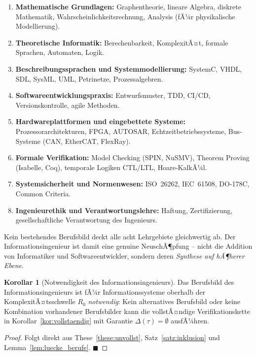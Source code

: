 ﻿\documentclass[a4paper,12pt]{report}
\theoremstyle{definition}
\newtheorem{korollar}{Korollar}[section]
\begin{document}
\begin{enumerate}
  \item \textbf{Mathematische Grundlagen:}
        Graphentheorie, lineare Algebra, diskrete Mathematik, Wahrscheinlichkeitsrechnung,
        Analysis (fÃ¼r physikalische Modellierung).
  \item \textbf{Theoretische Informatik:}
        Berechenbarkeit, KomplexitÃ¤t, formale Sprachen, Automaten, Logik.
  \item \textbf{Beschreibungssprachen und Systemmodellierung:}
        SystemC, VHDL, SDL, SysML, UML, Petrinetze, Prozessalgebren.
  \item \textbf{Softwareentwicklungspraxis:}
        Entwurfsmuster, TDD, CI/CD, Versionskontrolle, agile Methoden.
  \item \textbf{Hardwareplattformen und eingebettete Systeme:}
        Prozessorarchitekturen, FPGA, AUTOSAR, Echtzeitbetriebssysteme,
        Bus-Systeme (CAN, EtherCAT, FlexRay).
  \item \textbf{Formale Verifikation:}
        Model Checking (SPIN, NuSMV), Theorem Proving (Isabelle, Coq),
        temporale Logiken CTL/LTL, Hoare-KalkÃ¼l.
  \item \textbf{Systemsicherheit und Normenwesen:}
        ISO~26262, IEC~61508, DO-178C, Common Criteria.
  \item \textbf{Ingenieurethik und Verantwortungslehre:}
        Haftung, Zertifizierung, gesellschaftliche Verantwortung des Ingenieurs.
\end{enumerate}

Kein bestehendes Berufsbild deckt alle acht Lehrgebiete gleichwertig ab.
Der Informationsingenieur ist damit eine genuine NeuschÃ¶pfung -- nicht die Addition
von Informatiker und Softwareentwickler, sondern deren \emph{Synthese auf
hÃ¶herer Ebene}.

\begin{korollar}[Notwendigkeit des Informationsingenieurs]
\label{kor:notwendigkeit}
Das Berufsbild des Informationsingenieurs ist fÃ¼r Informationssysteme oberhalb der
KomplexitÃ¤tsschwelle $R_0$ \emph{notwendig}: Kein alternatives Berufsbild oder keine
Kombination vorhandener Berufsbilder kann die vollstÃ¤ndige Verifikationskette in
Korollar~\ref{kor:vollstaendig} mit Garantie $\Delta(\tau) = \emptyset$ ausfÃ¼hren.
\end{korollar}

\begin{proof}
Folgt direkt aus These~\ref{these:unvollst}, Satz~\ref{satz:inklusion}
und Lemma~\ref{lem:luecke_berufe}. $\blacksquare$
\end{proof}
\end{document}
